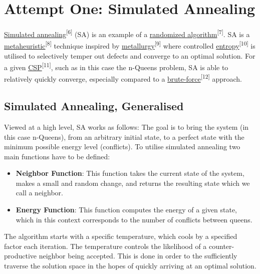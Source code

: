 \documentclass{article}
\begin{document}
\section{Attempt One: Simulated Annealing}
\href{https://en.wikipedia.org/wiki/Simulated_annealing}{Simulated annealing}\textsuperscript{[6]} (SA) is an example of a
\href{https://en.wikipedia.org/wiki/Randomized_algorithm}{randomized algorithm}\textsuperscript{[7]}.
SA is a \href{https://en.wikipedia.org/wiki/Metaheuristic}{metaheuristic}\textsuperscript{[8]} technique inspired by
\href{https://en.wikipedia.org/wiki/Metallurgy#:~:text=Metallurgy%20is%20a%20domain%20of,which%20are%20known%20as%20alloys.}{metallurgy}\textsuperscript{[9]} where controlled 
\href{https://en.wikipedia.org/wiki/Entropy}{entropy}\textsuperscript{[10]} is utilised to selectively temper out defects and converge to an optimal solution. For a given
\href{https://en.wikipedia.org/wiki/Constraint_satisfaction_problem}{CSP}\textsuperscript{[11]}, such as in this case the n-Queens problem, SA is able to relatively quickly converge,
especially compared to a \href{https://en.wikipedia.org/wiki/Brute-force_attack}{brute-force}\textsuperscript{[12]} approach.

\subsection{Simulated Annealing, Generalised}
Viewed at a high level, SA works as follows: The goal is to bring the system (in this case n-Queens), from an arbitrary initial state,
to a perfect state with the minimum possible energy level (conflicts).
To utilise simulated annealing two main functions have to be defined:

\begin{itemize}
    \item \textbf{Neighbor Function}: This function takes the current state of the system, makes a small and random change, and returns the resulting state which we call a neighbor.
    \item \textbf{Energy Function}: This function computes the energy of a given state, which in this context corresponds to the number of conflicts between queens.
\end{itemize}

The algorithm starts with a specific temperature, which cools by a specified factor each iteration.
The temperature controls the likelihood of a counter-productive neighbor being accepted.
This is done in order to the sufficiently traverse the solution space in the hopes of quickly arriving at an optimal solution.
\end{document}
